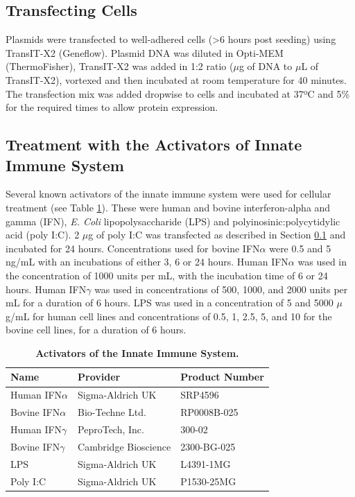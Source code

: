 \subsection{Transfecting Cells} \label{subsec:Transfecting Cells}
Plasmids were transfected to well-adhered cells (>6 hours post seeding) using TransIT-X2 (Geneflow). Plasmid DNA was diluted in Opti-MEM (ThermoFisher), TransIT-X2 was added in 1:2 ratio (\(\mu\)g of DNA to \(\mu\)L of TransIT-X2), vortexed and then incubated at room temperature for 40 minutes. The transfection mix was added dropwise to cells and incubated at 37ºC and 5\%  for the required times to allow protein expression.

\subsection{Treatment with the Activators of Innate Immune System} \label{subsec:Treatment with the Activators of Innate Immune System}
Several known activators of the innate immune system were used for cellular treatment (see Table \ref{tab:Activators of the Innate Immune System Table}). These were human and bovine interferon-alpha and gamma (IFN), \textit{E. Coli} lipopolysaccharide (LPS) and polyinosinic:polycytidylic acid (poly I:C). 2 \(\mu\)g of poly I:C was transfected as described in Section \ref{subsec:Transfecting Cells} and incubated for 24 hours. Concentrations used for bovine IFN\(\alpha\) were 0.5 and 5 ng/mL with an incubations of either 3, 6 or 24 hours. Human IFN\(\alpha\) was used in the concentration of 1000 units per mL, with the incubation time of 6 or 24 hours. Human IFN\(\gamma\) was used in concentrations of 500, 1000, and 2000 units per mL for a duration of 6 hours. LPS was used in a concentration of 5 and 5000 \(\mu\)g/mL for human cell lines and concentrations of 0.5, 1, 2.5, 5, and 10 for the bovine cell lines, for a duration of 6 hours.
 
\begin{table}
\centering
\begin{tabular}{lll}
\toprule
\textbf{Name} & \textbf{Provider}    & \textbf{Product Number} \\ \midrule
Human IFN\(\alpha\)    & Sigma-Aldrich UK     & SRP4596                 \\ 
Bovine IFN\(\alpha\)   & Bio-Techne Ltd.      & RP0008B-025             \\ 
Human IFN\(\gamma\)    & PeproTech, Inc.      & 300-02                  \\ 
Bovine IFN\(\gamma\)   & Cambridge Bioscience & 2300-BG-025             \\ 
LPS           & Sigma-Aldrich UK     & L4391-1MG               \\ 
Poly I:C      & Sigma-Aldrich UK     & P1530-25MG              \\ \bottomrule
\end{tabular}
\caption[Activators of the Innate Immune System.]{\textbf{Activators of the Innate Immune System.}}
\label{tab:Activators of the Innate Immune System Table}
\end{table}

